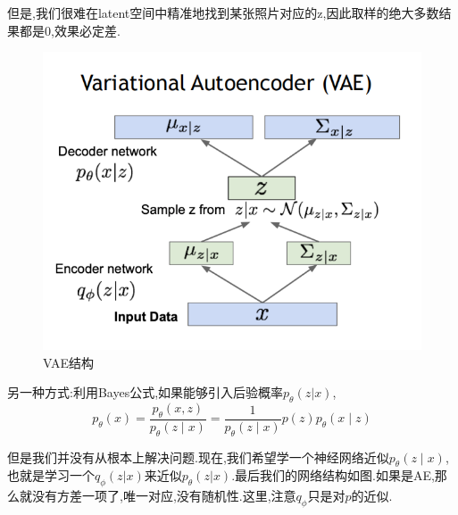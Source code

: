 	但是,我们很难在latent空间中精准地找到某张照片对应的z,因此取样的绝大多数结果都是0,效果必定差.
	
	\begin{figure}
		\includegraphics[scale=0.5]{figures/VAE_2.png}
		\caption{VAE结构}
	\end{figure}
	
	另一种方式:利用Bayes公式,如果能够引入后验概率$p_{\theta}(z|x)$,
	\begin{equation}
		p_{\theta}(x)=\frac{p_{\theta}(x, z)}{p_{\theta}(z \mid x)}=\frac{1}{p_{\theta}(z \mid x)} p(z) p_{\theta}(x \mid z)
	\end{equation}

	但是我们并没有从根本上解决问题.现在,我们希望学一个神经网络近似$p_{\theta}(z \mid x)$,也就是学习一个$q_{\phi}(z|x)$来近似$p_{\theta}(z|x)$.最后我们的网络结构如图.如果是AE,那么就没有方差一项了,唯一对应,没有随机性.这里,注意$q_{\phi}$只是对$p$的近似.
	
	\clearpage
	
